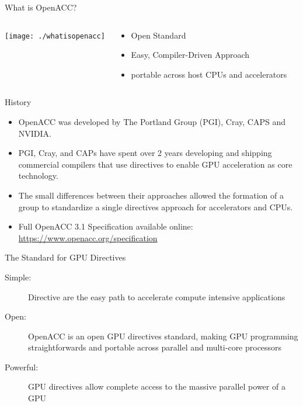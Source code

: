 \documentclass[10pt,t]{beamer}
\begin{document}
\begin{frame}[allowframebreaks]{What is OpenACC?}
  \begin{columns}
  \begin{center}
    \texttt{[image: ./whatisopenacc]}
  \end{center}
  \begin{block}{}
    \begin{itemize}
      \item Open Standard
      \item Easy, Compiler-Driven Approach
      \item portable across host CPUs and accelerators
    \end{itemize}
  \end{block}
  \end{columns}	

  \framebreak

  \begin{exampleblock}{History}
    \begin{itemize}
    \item OpenACC was developed by The Portland Group (PGI), Cray, CAPS and NVIDIA. 
    \item PGI, Cray, and CAPs have spent over 2 years developing and shipping commercial compilers that use directives to enable GPU acceleration as core technology. 
    \item The small differences between their approaches allowed the formation of a group to standardize a single directives approach for accelerators and CPUs.
    \item Full OpenACC 3.1 Specification available online: \url{https://www.openacc.org/specification}
    \end{itemize}
  \end{exampleblock}

  \begin{exampleblock}{The Standard for GPU Directives}
    \begin{description}
      \item[Simple:] Directive are the easy path to accelerate compute intensive applications
      \item[Open:] OpenACC is an open GPU directives standard, making GPU programming straightforwards and portable across parallel and multi-core processors
      \item[Powerful:] GPU directives allow complete access to the massive parallel power of a GPU
    \end{description}
  \end{exampleblock}
\end{frame}
\end{document}
